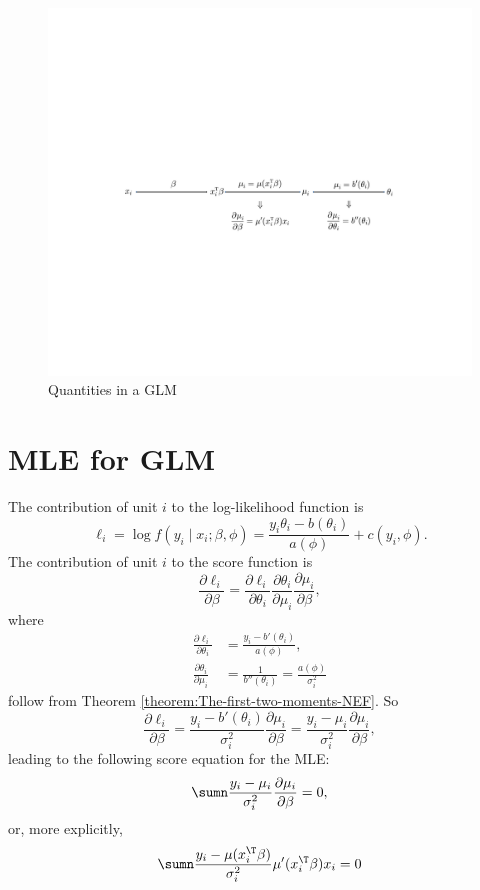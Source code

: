 \begin{figure}[ht]
\centering 
\includegraphics[width = \textwidth]{figures/nef-glm-plot}
\caption{Quantities in a GLM\label{fig:Quantities-in-a-glm}}
\end{figure}



\section{MLE for GLM}\label{sec::mle-glm-fisher}

The contribution of unit $i$ to the log-likelihood function is
\[
\ell_{i}=\log f(y_{i}\mid x_{i};\beta,\phi)=\frac{y_{i}\theta_{i}-b(\theta_{i})}{a(\phi)}+c(y_{i},\phi).
\]
The  contribution of unit $i$ to the score function is
\[
\frac{\partial\ell_{i}}{\partial\beta}=\frac{\partial\ell_{i}}{\partial\theta_{i}}\frac{\partial\theta_{i}}{\partial\mu_{i}}\frac{\partial\mu_{i}}{\partial\beta},
\]
where 
\begin{align*}
\frac{\partial\ell_{i}}{\partial\theta_{i}} & =\frac{y_{i}-b'(\theta_{i})}{a(\phi)},\\
\frac{\partial\theta_{i}}{\partial\mu_{i}} & =\frac{1}{b''(\theta_{i})}=\frac{a(\phi)}{\sigma_{i}^{2}}
\end{align*}
follow from Theorem \ref{theorem:The-first-two-moments-NEF}. 
So 
\[
\frac{\partial\ell_{i}}{\partial\beta}=\frac{y_{i}-b'(\theta_{i})}{\sigma_{i}^{2}}\frac{\partial\mu_{i}}{\partial\beta}=\frac{y_{i}-\mu_{i}}{\sigma_{i}^{2}}\frac{\partial\mu_{i}}{\partial\beta},
\]
leading to the following score equation for the MLE:
\begin{equation}
\sumn\frac{y_{i}-\mu_{i}}{\sigma_{i}^{2}}\frac{\partial\mu_{i}}{\partial\beta}=0,\label{eq:score-equation-mle-form1}
\end{equation}
or, more explicitly, 
\[
\sumn\frac{y_{i}-\mu (x_{i}^{\T}\beta) }{\sigma_{i}^{2}}\mu'(x_{i}^{\T}\beta)x_{i}=0
\]

